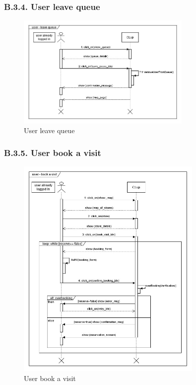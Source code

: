 \subsubsection{B.3.4. User leave queue}

\begin{figure}[H]
\centering
\includegraphics[width=0.75\textwidth]{sequence_diagrams/sequence_diagram_user_leave_queue}
\caption{User leave queue}
\end{figure}

\subsubsection{B.3.5. User book a visit}

\begin{figure}[H]
\centering
\includegraphics[width=0.8\textwidth]{sequence_diagrams/sequence_diagram_user_booking}
\caption{User book a visit}
\end{figure}

